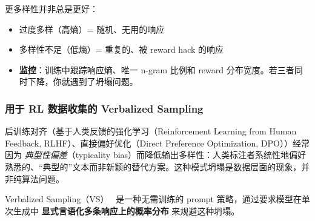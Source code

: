 \begin{warningbox}
更多样性并非总是更好：

\begin{itemize}
  \item 过度多样（高熵）= 随机、无用的响应
  \item 多样性不足（低熵）= 重复的、被 reward hack 的响应
  \item \textbf{监控}：训练中跟踪响应熵、唯一 n-gram 比例和 reward 分布宽度。若三者同时下降，你就遇到了坍塌问题。
\end{itemize}
\end{warningbox}

\subsubsection{用于 RL 数据收集的 Verbalized Sampling}
\label{verbalized-sampling-for-rl-data-collection}

后训练对齐（基于人类反馈的强化学习（Reinforcement Learning from Human Feedback, RLHF）、直接偏好优化（Direct Preference Optimization, DPO））经常因为 \emph{典型性偏差}（typicality bias）而降低输出多样性：人类标注者系统性地偏好熟悉的、“典型的”文本而非新颖的替代方案。这种模式坍塌是数据层面的现象，并非纯算法问题。

Verbalized Sampling（VS）~\cite{zhang2025verbalized} 是一种无需训练的 prompt 策略，通过要求模型在单次生成中 \textbf{显式言语化多条响应上的概率分布} 来规避这种坍塌。

